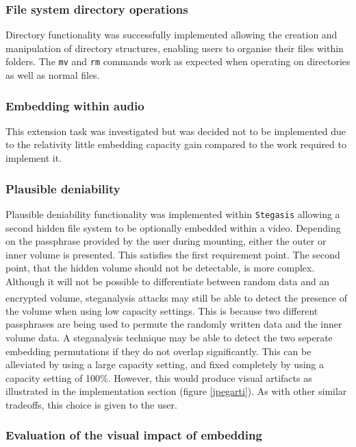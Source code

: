 \documentclass[paper=a4, fontsize=11pt,twoside]{scrartcl}
\numberwithin{table}{section}
\numberwithin{figure}{section}
\numberwithin{algorithm}{section}
\begin{document}
\subsubsection{File system directory operations}

Directory functionality was successfully implemented allowing the creation and manipulation of directory structures, enabling users to organise their files within folders. The \texttt{mv} and \texttt{rm} commands work as expected when operating on directories as well as normal files. 

\subsubsection{Embedding within audio}

This extension task was investigated but was decided not to be implemented due to the relativity little embedding capacity gain compared to the work required to implement it.

\subsubsection{Plausible deniability}

Plausible deniability functionality was implemented within \texttt{Stegasis} allowing a second hidden file system to be optionally embedded within a video. Depending on the passphrase provided by the user during mounting, either the outer or inner volume is presented. This satisfies the first requirement point. The second point, that the hidden volume should not be detectable, is more complex. Although it will not be possible to differentiate between random data and an encrypted volume\textsuperscript{\cite{random}}, steganalysis attacks may still be able to detect the presence of the volume when using low capacity settings. This is because two different passphrases are being used to permute the randomly written data and the inner volume data. A steganalysis technique may be able to detect the two seperate embedding permutations if they do not overlap significantly. This can be alleviated by using a large capacity setting, and fixed completely by using a capacity setting of 100\%. However, this would produce visual artifacts as illustrated in the implementation section (figure \ref{jpegarti}). As with other similar tradeoffs, this choice is given to the user.

\subsubsection{Evaluation of the visual impact of embedding}
\end{document}
